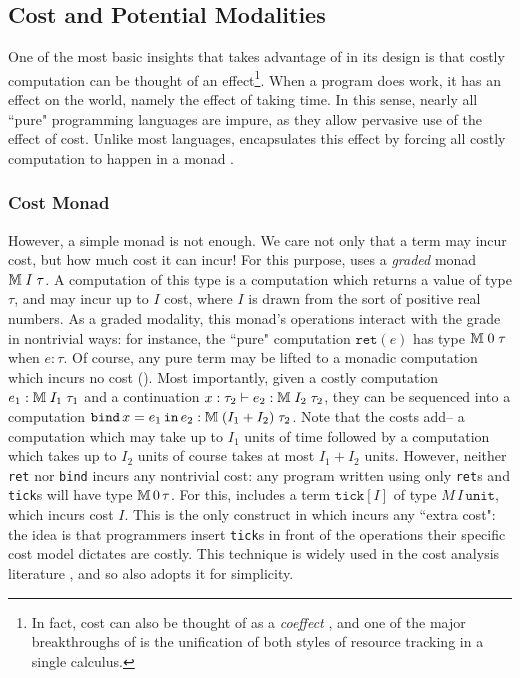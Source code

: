 \subsection{Cost and Potential Modalities}
One of the most basic insights that \lambdaamor takes advantage of in its design is that costly computation can be thought of an effect\footnote{
In fact, cost can also be thought of as a \textit{coeffect} \cite{girard-et-al:tcs92:bll}, and one of the major breakthroughs of \lambdaamor is the unification
of both styles of resource tracking in a single calculus.
}. When a program does work, it has an effect on the world, namely the effect of taking time. In this sense, nearly all ``pure" programming languages are impure, as they allow pervasive use of the effect of cost. Unlike most languages, \lambdaamor encapsulates this effect by forcing all costly computation to happen in a monad \citehere.

\subsubsection{Cost Monad}
 However, a simple monad is not enough. We care not only that a term may incur cost, but how much cost it can incur! For this purpose, \lambdaamor uses a \textit{graded} monad \citehere $\mathbb{M} \; I \; \tau$. A computation of this type is a computation which returns a value of type $\tau$, and may incur up to $I$ cost, where $I$ is drawn from the sort of positive real numbers. As a graded modality, this monad's operations interact with the grade in nontrivial ways: for instance, the ``pure" computation $\texttt{ret}(e)$ has type $\mathbb{M} \; 0 \; \tau$ when $e : \tau$. Of course, any pure term may be lifted to a monadic computation which incurs no cost (). Most importantly, given a costly computation $e_1 : \mathbb{M} \; I_1 \; \tau_1$ and a continuation $x : \tau_2 \vdash e_2 : \mathbb{M} \; I_2 \; \tau_2$, they can be sequenced into a computation $\texttt{bind}\, x = e_1\, \texttt{in}\, e_2 : \mathbb{M} \; (I_1 + I_2) \; \tau_2$. Note that the costs add-- a computation which may take up to $I_1$ units of time followed by a computation which takes up to $I_2$ units of course takes at most $I_1 + I_2$ units. However, neither \texttt{ret} nor \texttt{bind} incurs any nontrivial cost: any program written using only \texttt{ret}s and \texttt{tick}s will have type $\mathbb{M} \, 0 \, \tau$. For this, \lambdaamor includes a term $\texttt{tick}[I]$ of type $M \, I \, \texttt{unit}$, which incurs cost $I$. This is the only construct in \lambdaamor which incurs any ``extra cost": the idea is that programmers insert \texttt{tick}s in front of the operations their specific cost model dictates are costly. This technique is widely used in the cost analysis literature \citehere, and so \lambdaamor also adopts it for simplicity.
 

